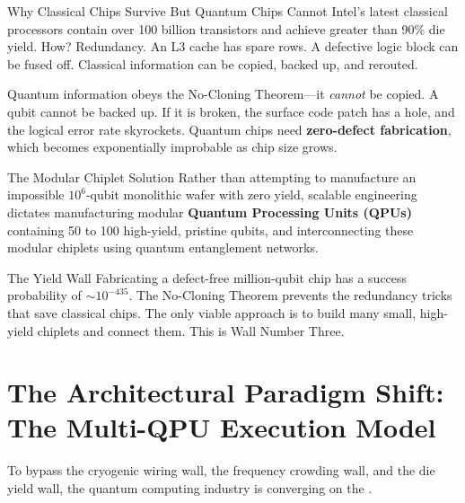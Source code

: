 \begin{insightbox}{Why Classical Chips Survive But Quantum Chips Cannot}
Intel's latest classical processors contain over 100 billion transistors and achieve greater than 90\% die yield. How? Redundancy. An L3 cache has spare rows. A defective logic block can be fused off. Classical information can be copied, backed up, and rerouted.

Quantum information obeys the No-Cloning Theorem---it \textit{cannot} be copied. A qubit cannot be backed up. If it is broken, the surface code patch has a hole, and the logical error rate skyrockets. Quantum chips need \textbf{zero-defect fabrication}, which becomes exponentially improbable as chip size grows.
\end{insightbox}

\begin{definitionbox}{The Modular Chiplet Solution}
Rather than attempting to manufacture an impossible $10^6$-qubit monolithic wafer with zero yield, scalable engineering dictates manufacturing modular \textbf{Quantum Processing Units (QPUs)} containing 50 to 100 high-yield, pristine qubits, and interconnecting these modular chiplets using quantum entanglement networks.
\end{definitionbox}

\begin{summarybox}{The Yield Wall}
Fabricating a defect-free million-qubit chip has a success probability of $\sim 10^{-435}$. The No-Cloning Theorem prevents the redundancy tricks that save classical chips. The only viable approach is to build many small, high-yield chiplets and connect them. This is Wall Number Three.
\end{summarybox}


\section{The Architectural Paradigm Shift: The Multi-QPU Execution Model}
\label{sec:paradigm_shift}

To bypass the cryogenic wiring wall, the frequency crowding wall, and the die yield wall, the quantum computing industry is converging on the .

